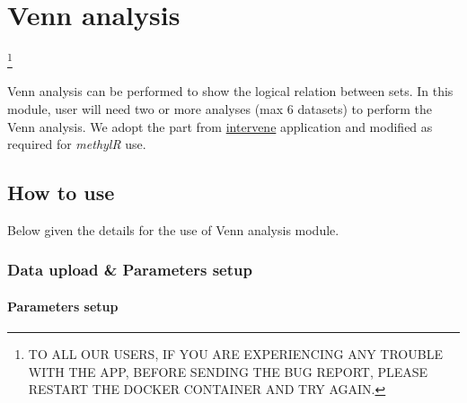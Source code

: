 \documentclass[
  a4paper,
  DIV=11,
  numbers=noendperiod,
  oneside,
  open=any]{scrreport}
\begin{document}
\chapter{Venn analysis}\label{sec-venn}

\footnote{TO ALL OUR USERS, IF YOU ARE EXPERIENCING ANY TROUBLE WITH THE
  APP, BEFORE SENDING THE BUG REPORT, PLEASE RESTART THE DOCKER
  CONTAINER AND TRY AGAIN.}

Venn analysis can be performed to show the logical relation between
sets. In this module, user will need two or more analyses (max 6
datasets) to perform the Venn analysis. We adopt the part from
\href{https://github.com/asntech/intervene}{intervene}
\autocite{khan2017intervene} application and modified as required for
\emph{methylR} use.

\section{How to use}\label{how-to-use-9}

Below given the details for the use of Venn analysis module.

\subsection{Data upload \& Parameters
setup}\label{data-upload-parameters-setup-6}

\subsubsection{Parameters setup}\label{parameters-setup-3}
\end{document}
